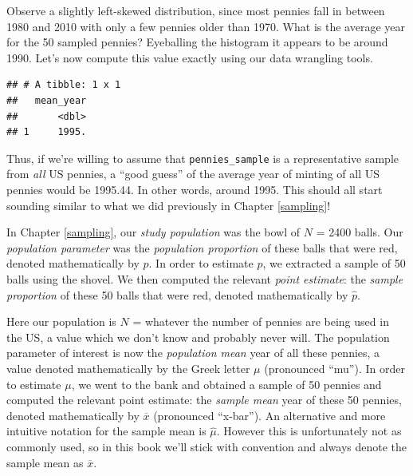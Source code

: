 \documentclass[
]{book}
\newenvironment{Shaded}{\begin{snugshade}}{\end{snugshade}}
\newcommand{\DataTypeTok}[1]{\textcolor[rgb]{0.13,0.29,0.53}{#1}}
\newcommand{\KeywordTok}[1]{\textcolor[rgb]{0.13,0.29,0.53}{\textbf{#1}}}
\newcommand{\NormalTok}[1]{#1}
\newcommand{\OperatorTok}[1]{\textcolor[rgb]{0.81,0.36,0.00}{\textbf{#1}}}
\newcommand{\StringTok}[1]{\textcolor[rgb]{0.31,0.60,0.02}{#1}}
\begin{document}
Observe a slightly left-skewed  distribution, since most pennies fall in between 1980 and 2010 with only a few pennies older than 1970. What is the average year for the 50 sampled pennies? Eyeballing the histogram it appears to be around 1990. Let's now compute this value exactly using our data wrangling tools.

\begin{Shaded}
\end{Shaded}

\begin{verbatim}
## # A tibble: 1 x 1
##   mean_year
##       <dbl>
## 1     1995.
\end{verbatim}

Thus, if we're willing to assume that \texttt{pennies\_sample} is a representative sample from \emph{all} US pennies, a ``good guess'' of the average year of minting of all US pennies would be 1995.44. In other words, around 1995. This should all start sounding similar to what we did previously in Chapter \ref{sampling}!

In Chapter \ref{sampling}, our \emph{study population} was the bowl of \(N\) = 2400 balls. Our \emph{population parameter} was the \emph{population proportion} of these balls that were red, denoted mathematically by \(p\). In order to estimate \(p\), we extracted a sample of 50 balls using the shovel. We then computed the relevant \emph{point estimate}: the \emph{sample proportion} of these 50 balls that were red, denoted mathematically by \(\widehat{p}\).

Here our population is \(N\) = whatever the number of pennies are being used in the US, a value which we don't know and probably never will. The population parameter of interest is now the \emph{population mean} year of all these pennies, a value denoted mathematically by the Greek letter \(\mu\) (pronounced ``mu''). In order to estimate \(\mu\), we went to the bank and obtained a sample of 50 pennies and computed the relevant point estimate: the \emph{sample mean} year of these 50 pennies, denoted mathematically by \(\overline{x}\) (pronounced ``x-bar''). An alternative and more intuitive notation for the sample mean is \(\widehat{\mu}\). However this is unfortunately not as commonly used, so in this book we'll stick with convention and always denote the sample mean as \(\overline{x}\).
\end{document}
